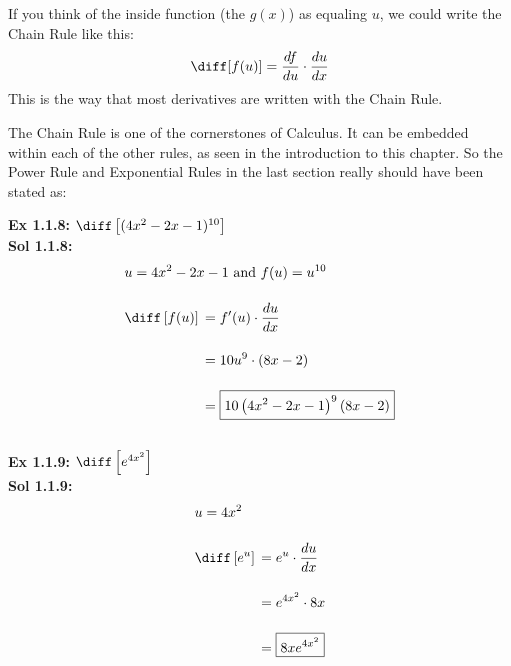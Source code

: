 If you think of the inside function (the $g(x)$) as equaling $u$, we could write the Chain Rule like this: \begin{align*}
    \diff[f(u)] = \dfrac{df}{du} \cdot \dfrac{du}{dx}
\end{align*}
This is the way that most derivatives are written with the Chain Rule. \par

The Chain Rule is one of the cornerstones of Calculus. It can be embedded within each of the other rules, as seen in the introduction to this chapter. So the Power Rule and Exponential Rules in the last section really should have been stated as: 


\textbf{Ex 1.1.8:} $\diff \left[(4x^2 - 2x - 1)^{10}\right]$ \\[11pt]
\textbf{Sol 1.1.8:} \begin{align*}
    & u = 4x^2 - 2x - 1 \text{ and } f(u) = u^{10} \\[11pt]
    & \diff \left[f(u)\right] \begin{aligned}[t]
        & = f'(u) \cdot \dfrac{du}{dx} \\[11pt] 
        & = 10u^9 \cdot \left(8x - 2\right) \\[11pt]
        & = \boxed{10\left(4x^2 - 2x - 1\right)^9(8x - 2)} \\[11pt]
    \end{aligned}
\end{align*}

\textbf{Ex 1.1.9:} $\diff \left[e^{4x^2}\right]$ \\[11pt]
\textbf{Sol 1.1.9:} \begin{align*}
    & u = 4x^2 \\[11pt]
    & \diff \left[e^u\right] \begin{aligned}[t]
        & = e^u \cdot \dfrac{du}{dx} \\[11pt]
        & = e^{4x^2} \cdot 8x \\[11pt]
        & = \boxed{8xe^{4x^2}}
    \end{aligned}
\end{align*}

